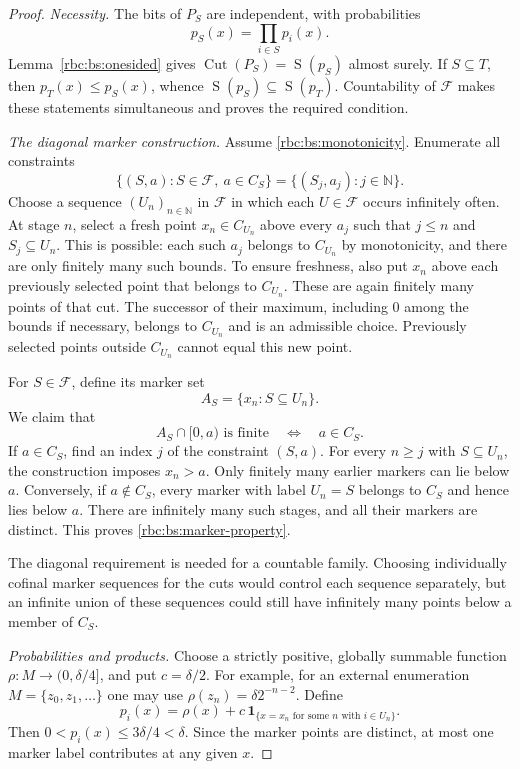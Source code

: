 \documentclass[11pt]{article}
\numberwithin{equation}{section}
\theoremstyle{definition}
\theoremstyle{remark}
\newcommand{\N}{\mathbb N}
\newcommand{\Cut}{\operatorname{Cut}}
\newcommand{\SumCut}{\operatorname{S}}
\begin{document}
\begin{proof}
\emph{Necessity.}
The bits of $P_S$ are independent, with probabilities
\[
  p_S(x)=\prod_{i\in S}p_i(x).
\]
Lemma~\ref{rbc:bs:onesided} gives
$\Cut(P_S)=\SumCut(p_S)$ almost surely.  If $S\subseteq T$, then
$p_T(x)\leq p_S(x)$, whence
$\SumCut(p_S)\subseteq\SumCut(p_T)$.  Countability of $\mathcal F$ makes
these statements simultaneous and proves the required condition.

\emph{The diagonal marker construction.}
Assume \eqref{rbc:bs:monotonicity}.  Enumerate all constraints
\[
  \{(S,a):S\in\mathcal F,\ a\in C_S\}
     =\{(S_j,a_j):j\in\N\}.
\]
Choose a sequence $(U_n)_{n\in\N}$ in $\mathcal F$ in which each
$U\in\mathcal F$ occurs infinitely often.  At stage $n$, select a fresh
point $x_n\in C_{U_n}$ above every $a_j$ such that
$j\leq n$ and $S_j\subseteq U_n$.  This is possible: each such $a_j$
belongs to $C_{U_n}$ by monotonicity, and there are only finitely many such
bounds.  To ensure freshness, also put $x_n$ above each previously selected
point that belongs to $C_{U_n}$.  These are again finitely many points of
that cut.  The successor of their maximum, including $0$ among the bounds
if necessary, belongs to $C_{U_n}$ and is an admissible choice.  Previously
selected points outside $C_{U_n}$ cannot equal this new point.

For $S\in\mathcal F$, define its marker set
\[
  A_S=\{x_n:S\subseteq U_n\}.
\]
We claim that
\begin{equation}
\label{rbc:bs:marker-property}
  A_S\cap[0,a)\text{ is finite}\quad\Longleftrightarrow\quad a\in C_S.
\end{equation}
If $a\in C_S$, find an index $j$ of the constraint $(S,a)$.  For every
$n\geq j$ with $S\subseteq U_n$, the construction imposes $x_n>a$.
Only finitely many earlier markers can lie below $a$.  Conversely, if
$a\notin C_S$, every marker with label $U_n=S$ belongs to $C_S$ and hence
lies below $a$.  There are infinitely many such stages, and all their
markers are distinct.  This proves \eqref{rbc:bs:marker-property}.

The diagonal requirement is needed for a countable family.  Choosing
individually cofinal marker sequences for the cuts would control each
sequence separately, but an infinite union of these sequences could still
have infinitely many points below a member of $C_S$.

\emph{Probabilities and products.}
Choose a strictly positive, globally summable function
$\rho:M\to(0,\delta/4]$, and put $c=\delta/2$.  For example, for
an external enumeration $M=\{z_0,z_1,\ldots\}$ one may use
$\rho(z_n)=\delta 2^{-n-2}$.  Define
\begin{equation}
\label{rbc:bs:bias-construction}
  p_i(x)=\rho(x)+c\,\mathbf1_{
    \{x=x_n\text{ for some }n\text{ with }i\in U_n\}}.
\end{equation}
Then $0<p_i(x)\leq3\delta/4<\delta$.  Since the marker points are
distinct, at most one marker label contributes at any given $x$.


\end{proof}
\end{document}
